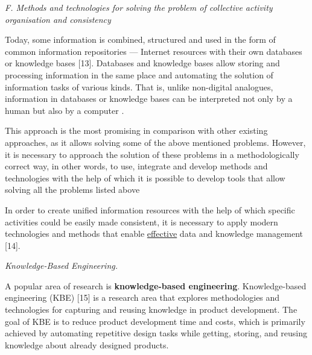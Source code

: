 \documentclass[a4paper]{article}
\begin{document}
\setlength\parindent{11pt}
\fontsize{9.7}{13}\selectfont

\begin{multicols}{2}


{\setlength{\parindent}{0pt}\nohyphens{\textit{F. Methods and technologies for solving the problem of collective activity organisation and consistency   }}} \par

\vspace{0.5mm}

{\fontsize{9.5}{13}\selectfont Today, some information is combined, structured and used in the form of common information repositories — Internet resources with their own databases or knowledge bases [13]. Databases and knowledge bases allow storing and processing information in the same place and automating the solution of information tasks of various kinds. That is, unlike non-digital analogues, information in databases or knowledge bases can be interpreted not only by a human but also by a computer .\par}

{\fontsize{9.5}{13}\selectfont This approach is the most promising in comparison with other existing approaches, as it allows solving some of the above mentioned problems. However, it is necessary to approach the solution of these problems in a methodologically correct way, in other words, to use, integrate and develop methods and technologies with the help of which it is possible to develop tools that allow solving all the problems listed above 
\par}


{\fontsize{9.5}{13}\selectfont  In order to create unified information resources with
the help of which specific activities could be easily made
consistent, it is necessary to apply modern technologies
and methods that enable \underline{effective} data and knowledge
management [14].}

{\setlength{\parindent}{0pt}\nohyphens{\textit{Knowledge-Based Engineering.}}} \par

{\fontsize{9.5}{13}\selectfont A popular area of research is \textbf{knowledge-based engineering}. Knowledge-based engineering (KBE) [15] is
a research area that explores methodologies and technologies for capturing and reusing knowledge in product
development. The goal of KBE is to reduce product development time and costs, which is primarily achieved by
automating repetitive design tasks while getting, storing,
and reusing knowledge about already designed products.}


\end{multicols}
\end{document}
